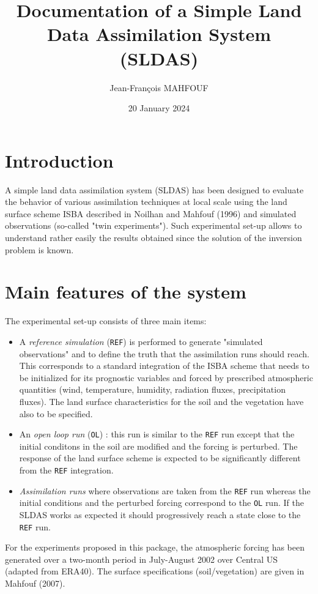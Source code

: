 \documentclass[12pt]{article}
\begin{document}
\title{Documentation of a Simple Land Data Assimilation System (SLDAS)}
\author{Jean-Fran\c cois MAHFOUF}
\date{20 January 2024}
\maketitle
\section{Introduction}
A simple land data assimilation system (SLDAS) has been designed
to evaluate the behavior of various assimilation techniques at local scale
using the land surface scheme ISBA described in Noilhan and Mahfouf (1996)
and simulated observations (so-called "twin experiments"). 
Such experimental set-up allows to understand rather easily 
the results obtained since the solution of the inversion problem is known.
\section{Main features of the system}
The experimental set-up consists of three main items:
\begin{itemize}
\item A {\it reference simulation} ({\tt REF}) is performed to generate 
"simulated observations" and to define the truth that the assimilation
runs should reach. 
This corresponds to a standard integration of the
ISBA scheme that needs to be initialized for its prognostic variables
and forced by prescribed atmospheric quantities (wind, temperature,
humidity, radiation fluxes, precipitation fluxes). The land surface
characteristics for the soil and the vegetation have also to be specified.
\item An {\it open loop run} ({\tt OL}) : this run is similar to the {\tt REF} run except
that the initial conditons in the soil are modified and the forcing
is perturbed. The response of the land surface scheme is expected to be
significantly different from the {\tt REF} integration.
\item {\it Assimilation runs} where observations are taken from the {\tt REF} run
whereas the initial conditions and the perturbed forcing correspond to the
{\tt OL} run. If the SLDAS works as expected it should progressively 
reach a state close to the {\tt REF} run. 
\end{itemize}
\vspace{0.5cm}
For the experiments proposed in this package,
the atmospheric forcing has been generated over a two-month period
in July-August 2002 over Central US (adapted from ERA40). The surface
specifications (soil/vegetation) are given in Mahfouf (2007). 
\end{document}
